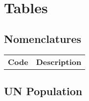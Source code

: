 \chapter{Tables}

\pagebreak
\section{Nomenclatures}

\begin{tabular}{l|c}%
    \bfseries Code & \bfseries Description%
\end{tabular}

\pagebreak


\pagebreak
\section{UN Population}\label{app:unpop}

